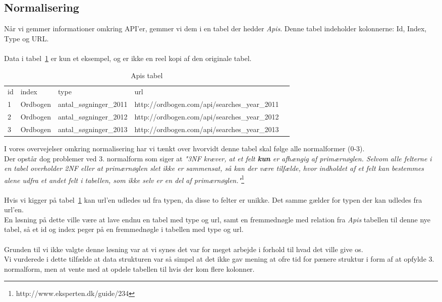 \subsection{Normalisering}
Når vi gemmer informationer omkring API'er, gemmer vi dem i en tabel der hedder \textit{Apis}. Denne tabel indeholder kolonnerne: Id, Index, Type og URL.
\\\\
Data i tabel~\ref{table:api-tabel} er kun et eksempel, og er ikke en reel kopi af den originale tabel.
\begin{table}[H]
    \centering
    \begin{tabular}{|l|l|l|l|l}
        \cline{1-4}
        id & index  &  type &  url &  \\ \cline{1-4}
        1 & Ordbogen & antal\_søgninger\_2011 & http://ordbogen.com/api/searches\_year\_2011 &  \\ \cline{1-4}
        2 & Ordbogen & antal\_søgninger\_2012 & http://ordbogen.com/api/searches\_year\_2012 &  \\ \cline{1-4}
        3 & Ordbogen & antal\_søgninger\_2013 & http://ordbogen.com/api/searches\_year\_2013 &  \\ \cline{1-4}
    \end{tabular}
    \caption{Apis tabel}
    \label{table:api-tabel}
\end{table}

I vores overvejelser omkring normalisering har vi tænkt over hvorvidt denne tabel skal følge alle normalformer (0-3).
\\
Der opstår dog problemer ved 3. normalform som siger at \textit{"3NF kræver, at et felt \textbf{kun} er afhængig af primærnøglen.
Selvom alle felterne i en tabel overholder 2NF eller at primærnøglen slet ikke er sammensat, så kan der være tilfælde, hvor indholdet af et felt kan bestemmes alene udfra et andet felt i tabellen, som ikke selv er en del af primærnøglen."}\footnote{http://www.eksperten.dk/guide/234}
\\\\
Hvis vi kigger på tabel~\ref{table:api-tabel} kan url'en udledes ud fra typen, da disse to felter er unikke. Det samme gælder for typen der kan udledes fra url'en.
\\
En løsning på dette ville være at lave endnu en tabel med type og url, samt en fremmednøgle med relation fra \textit{Apis} tabellen til denne nye tabel, så et id og index peger på en fremmednøgle i tabellen med type og url.
\\\\
Grunden til vi ikke valgte denne løsning var at vi synes det var for meget arbejde i forhold til hvad det ville give os.
\\
Vi vurderede i dette tilfælde at data strukturen var så simpel at det ikke gav mening at ofre tid for pænere struktur i form af at opfylde 3. normalform, men at vente med at opdele tabellen til hvis der kom flere kolonner.
